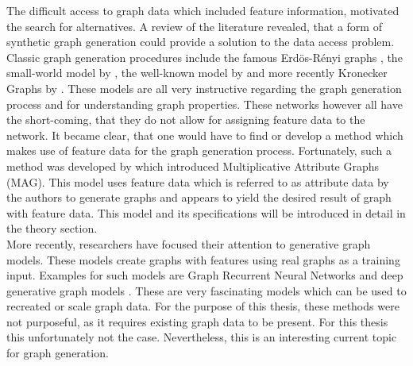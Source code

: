 	\noindent The difficult access to graph data which included feature
	information, motivated the search for alternatives. A review of the
	literature revealed, that a form of synthetic graph generation could
	provide a solution to the data access problem. Classic graph generation
	procedures include the famous Erdös-Rényi graphs \citep{erdos1959random},
	the small-world model by \cite{watts1998collective}, the well-known model
	by \cite{barabasi1999emergence} and more recently Kronecker Graphs by
	\cite{leskovec2010kronecker}. These models are all very instructive
	regarding the graph generation process and for understanding graph
	properties. These networks however all have the short-coming, that they do 
	not allow for assigning feature data to the network. It became clear, that 
	one would have to find or develop a method which makes use of feature data 
	for the graph generation process. Fortunately, such a method was developed 
	by \cite{kim2012multiplicative} which introduced Multiplicative Attribute 
	Graphs (MAG). This model uses feature data which is referred to as 
	attribute data by the authors to generate graphs and appears to yield the 
	desired result of graph with feature data. This model and its 
	specifications will be introduced in detail in the theory section. \\

	\noindent More recently, researchers have focused their attention to
	generative graph models. These models create graphs with features using
	real graphs as a training input. Examples for such models are Graph
	Recurrent Neural Networks \citep{you2018graphrnn} and deep generative graph
	models \citep{li2018learning}. These are very fascinating models which can
	be used to recreated or scale graph data. For the purpose of this thesis,
	these methods were not purposeful, as it requires existing graph data to be
	present. For this thesis this unfortunately not the case. Nevertheless,
	this is an interesting current topic for graph generation. \\ 

